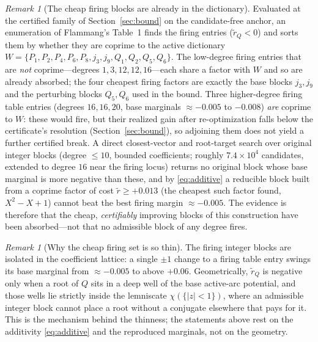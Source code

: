 \documentclass[11pt,reqno]{amsart}
\theoremstyle{plain}
\theoremstyle{definition}
\theoremstyle{remark}
\newtheorem{remark}[theorem]{Remark}
\begin{document}
\begin{remark}[The cheap firing blocks are already in the dictionary]\label{rem:evidence}
Evaluated at the certified family of Section~\ref{sec:bound} on the candidate-free
anchor, an enumeration of Flammang's \citep{F18} Table~1 finds the firing entries
($\widetilde r_Q<0$) and sorts them by whether they are coprime to the active
dictionary $W=\{P_1,P_2,P_4,P_6,P_8,j_3,j_9,Q_1,Q_2,Q_5,Q_6\}$. The low-degree firing
entries that are \emph{not} coprime---degrees $1,3,12,12,16$---each share a factor with
$W$ and so are already absorbed; the four cheapest firing factors are exactly the base
blocks $j_3,j_9$ and the perturbing blocks $Q_5,Q_6$ used in the bound. Three
higher-degree firing table entries (degrees $16,16,20$, base marginals $\approx-0.005$
to $-0.008$) \emph{are} coprime to $W$: these would fire, but their realized gain after
re-optimization falls below the certificate's resolution (Section~\ref{sec:bound}), so
adjoining them does not yield a further certified break. A direct closest-vector and
root-target search over original integer blocks (degree $\le10$, bounded coefficients;
roughly $7.4\times10^4$ candidates, extended to degree $16$ near the firing locus)
returns no original block whose base marginal is more negative than these, and by
\eqref{eq:additive} a reducible block built from a coprime factor of cost
$\widetilde r\ge+0.013$ (the cheapest such factor found, $X^2-X+1$) cannot beat the
best firing margin $\approx-0.005$. The evidence is therefore that the cheap,
\emph{certifiably} improving blocks of this construction have been absorbed---not that
no admissible block of any degree fires.
\end{remark}

\begin{remark}[Why the cheap firing set is so thin]\label{rem:wells}
The firing integer blocks are isolated in the coefficient lattice: a single $\pm1$
change to a firing table entry swings its base marginal from $\approx-0.005$ to above
$+0.06$. Geometrically, $\widetilde r_Q$ is negative only when a root of $Q$ sits in a
deep well of the base active-arc potential, and those wells lie strictly inside the
lemniscate $\chi(\{|z|<1\})$, where an admissible integer block cannot place a root
without a conjugate elsewhere that pays for it. This is the mechanism behind the
thinness; the statements above rest on the additivity \eqref{eq:additive} and the
reproduced marginals, not on the geometry.
\end{remark}
\end{document}
